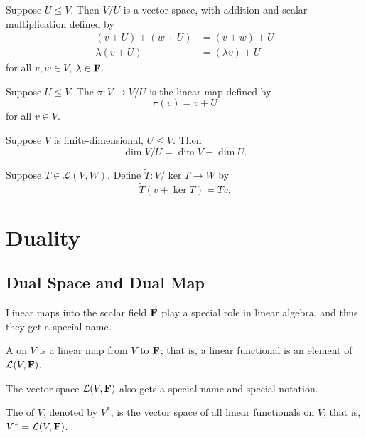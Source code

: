 \begin{proposition}
Suppose $U\le V$. Then $V/U$ is a vector space, with addition and scalar multiplication defined by
\begin{align*}
(v+U)+(w+U)&=(v+w)+U\\
\lambda(v+U)&=(\lambda v)+U
\end{align*}
for all $v,w\in V$, $\lambda\in\mathbf F$.
\end{proposition}

\begin{definition}
Suppose $U\le V$. The  $\pi:V\to V/U$ is the linear map defined by
\[\pi(v)=v+U\]
for all $v\in V$.
\end{definition}

\begin{proposition}
Suppose $V$ is finite-dimensional, $U\le V$. Then
\[\dim V/U=\dim V-\dim U.\]
\end{proposition}

\begin{definition}
Suppose $T\in\mathcal{L}(V,W)$. Define $\tilde{T}:V/\ker T\to W$ by
\[\tilde{T}(v+\ker T)=Tv.\]
\end{definition}

\section{Duality}
\subsection{Dual Space and Dual Map}
Linear maps into the scalar field $\mathbf F$ play a special role in linear algebra, and thus they get a special name.

\begin{definition}
A  on $V$ is a linear map from $V$ to $\mathbf F$; that is, a linear functional is an element of $\mathcal{L}(V,\mathbf F)$.
\end{definition}

The vector space $\mathcal{L}(V,\mathbf F)$ also gets a special name and special notation.

\begin{definition}
The  of $V$, denoted by $V^*$, is the vector space of all linear functionals on $V$; that is, $V^*=\mathcal{L}(V,\mathbf F)$.
\end{definition}

